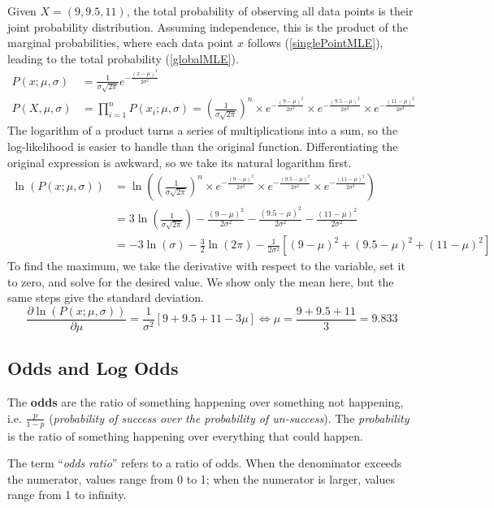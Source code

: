 \begin{example}

Given \( X = (9, 9.5, 11) \), the total probability of observing all data points is their joint probability distribution. Assuming independence, this is the product of the marginal probabilities, where each data point \( x \) follows (\ref{singlePointMLE}), leading to the total probability (\ref{globalMLE}).
\begin{align}
P(x;\mu,\sigma) &=\frac{1}{\sigma\sqrt{2\pi}}e^{-\frac{(x-\mu)^2}{2\sigma^2}}    \label{singlePointMLE}
\\
P(X, \mu, \sigma) &= \prod_{i=1}^n P(x_i;\mu,\sigma) 
=\left(\frac{1}{\sigma\sqrt{2\pi}}\right)^n \times e^{-\frac{(9-\mu)^2}{2\sigma^2}} \times e^{-\frac{(9.5-\mu)^2}{2\sigma^2}} \times e^{-\frac{(11-\mu)^2}{2\sigma^2}}    \label{globalMLE}
\end{align}
The logarithm of a product turns a series of multiplications into a sum, so the log-likelihood is easier to handle than the original function. Differentiating the original expression is awkward, so we take its natural logarithm first.
\begin{align*}
    \ln(P(x;\mu,\sigma)) &= \ln \left(\left(\frac{1}{\sigma\sqrt{2\pi}}\right)^n \times e^{-\frac{(9-\mu)^2}{2\sigma^2}} \times e^{-\frac{(9.5-\mu)^2}{2\sigma^2}} \times e^{-\frac{(11-\mu)^2}{2\sigma^2}}\right)
    \\
    &=3\ln\left(\frac{1}{\sigma\sqrt{2\pi}}\right)-\frac{(9-\mu)^2}{2\sigma^2}- \frac{(9.5-\mu)^2}{2\sigma^2}- \frac{(11-\mu)^2}{2\sigma^2}
    \\
&=-3\ln(\sigma)-\frac{3}{2}\ln(2\pi)-\frac{1}{2\sigma^2}[(9-\mu)^2+(9.5-\mu)^2+(11-\mu)^2]
\end{align*}
To find the maximum, we take the derivative with respect to the variable, set it to zero, and solve for the desired value. We show only the mean here, but the same steps give the standard deviation.
\[
\frac{\partial\ln(P(x;\mu,\sigma))}{\partial\mu}=\frac{1}{\sigma^2}[9+9.5+11-3\mu]\Longleftrightarrow\mu=\frac{9+9.5+11}{3}=9.833\]
\end{example}

\subsection{Odds and Log Odds}
\begin{definition}[Odds]
    The \textbf{odds} are the ratio of something happening over something not happening, i.e. $\frac{p}{1-p}$ (\textit{probability of success over the probability of un-success}).
    The \textit{probability} is the ratio of something happening over everything that could happen.     
\end{definition}
The term ``\textit{odds ratio}'' refers to a ratio of odds. When the denominator exceeds the numerator, values range from 0 to 1; when the numerator is larger, values range from 1 to infinity.


